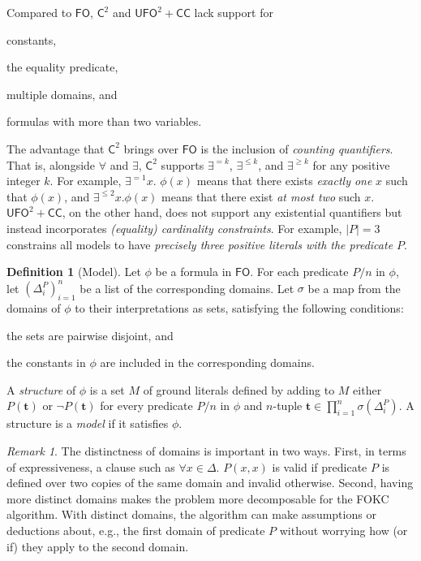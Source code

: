 \documentclass[letterpaper]{article} %
\theoremstyle{remark}
\newtheorem*{remark}{Remark}
\theoremstyle{definition}
\newtheorem{definition}{Definition}
\newcommand{\Ctwo}{$\mathsf{C}^{2}$}
\newcommand{\FO}{$\mathsf{FO}$}
\newcommand{\UFO}{$\mathsf{UFO}^{2} + \mathsf{CC}$}
\begin{document}
Compared to \FO{}, \Ctwo{} and \UFO{} lack support for
\begin{enumerate*}[label=(\roman*)]
  \item constants,
  \item the equality predicate,
  \item multiple domains, and
  \item formulas with more than two variables.
\end{enumerate*}
The advantage that \Ctwo{} brings over \FO{} is the inclusion of \emph{counting
  quantifiers}. That is, alongside $\forall$ and $\exists$, \Ctwo{} supports
$\exists^{=k}$, $\exists^{\le k}$, and $\exists^{\ge k}$ for any positive
integer $k$. For example, $\exists^{=1} x\text{. }\phi(x)$ means that there
exists \emph{exactly one} $x$ such that $\phi(x)$, and $\exists^{\le 2} x\text{.
}\phi(x)$ means that there exist \emph{at most two} such $x$. \UFO{}, on the
other hand, does not support any existential quantifiers but instead
incorporates \emph{(equality) cardinality constraints}. For example, $|P| = 3$
constrains all models to have \emph{precisely three positive literals with the
  predicate $P$}.

\begin{definition}[Model]\label{def:model}
  Let $\phi$ be a formula in \FO{}. For each predicate $P/n$ in $\phi$, let
  ${(\Delta_{i}^{P})}_{i=1}^{n}$ be a list of the corresponding domains. Let
  $\sigma$ be a map from the domains of $\phi$ to their interpretations as sets,
  satisfying the following conditions:
  \begin{enumerate*}[label=(\roman*)]
    \item the sets are pairwise disjoint, and
    \item the constants in $\phi$ are included in the corresponding domains.
  \end{enumerate*}
  A \emph{structure} of $\phi$ is a set $M$ of ground literals defined by adding
  to $M$ either $P(\mathbf{t})$ or $\neg P(\mathbf{t})$ for every predicate
  $P/n$ in $\phi$ and $n$-tuple
  $\mathbf{t} \in \prod_{i=1}^{n} \sigma(\Delta_{i}^{P})$. A structure is a
  \emph{model} if it satisfies $\phi$.
\end{definition}


\begin{remark}
  The distinctness of domains is important in two ways. First, in terms of
  expressiveness, a clause such as $\forall x \in \Delta\text{. }P(x, x)$ is
  valid if predicate $P$ is defined over two copies of the same domain and
  invalid otherwise. Second, having more distinct domains makes the problem more
  decomposable for the FOKC algorithm. With distinct domains, the algorithm can
  make assumptions or deductions about, e.g., the first domain of predicate $P$
  without worrying how (or if) they apply to the second domain.
\end{remark}
\end{document}
